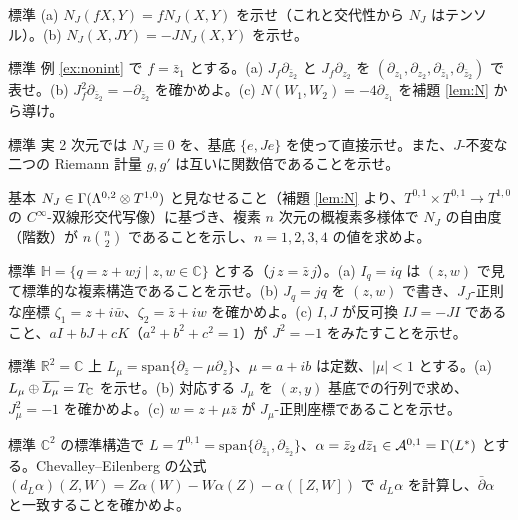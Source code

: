 \begin{prob}{標準}\label{p:Ntensor}
(a) $N_J(fX,Y)=fN_J(X,Y)$ を示せ（これと交代性から $N_J$ はテンソル）。(b) $N_J(X,JY)=-JN_J(X,Y)$ を示せ。
\end{prob}
\begin{prob}{標準}\label{p:Nexample}
例 \ref{ex:nonint} で $f=\bar z_1$ とする。(a) $J_f\partial_{\bar z_2}$ と $J_f\partial_{z_2}$ を $(\partial_{z_1},\partial_{z_2},\partial_{\bar z_1},\partial_{\bar z_2})$ で表せ。(b) $J_f^2\partial_{\bar z_2}=-\partial_{\bar z_2}$ を確かめよ。(c) $N(W_1,W_2)=-4\partial_{z_1}$ を補題 \ref{lem:N} から導け。
\end{prob}
\begin{prob}{標準}\label{p:dim2}
実 2 次元では $N_J\equiv0$ を、基底 $\{e,Je\}$ を使って直接示せ。また、$J$-不変な二つの Riemann 計量 $g,g'$ は互いに関数倍であることを示せ。
\end{prob}
\begin{prob}{基本}\label{p:Ndim}
$N_J\in\Gamma(\Lambda^{0,2}\otimes T^{1,0})$ と見なせること（補題 \ref{lem:N} より、$T^{0,1}\times T^{0,1}\to T^{1,0}$ の $C^\infty$-双線形交代写像）に基づき、複素 $n$ 次元の概複素多様体で $N_J$ の自由度（階数）が $n\binom n2$ であることを示し、$n=1,2,3,4$ の値を求めよ。
\end{prob}
\begin{prob}{標準}\label{p:quat}
$\mathbb H=\{q=z+wj\mid z,w\in\mathbb C\}$ とする（$j\,z=\bar z\,j$）。(a) $I_q=iq$ は $(z,w)$ で見て標準的な複素構造であることを示せ。(b) $J_q=jq$ を $(z,w)$ で書き、$J_J$-正則な座標 $\zeta_1=z+i\bar w$、$\zeta_2=\bar z+iw$ を確かめよ。(c) $I,J$ が反可換 $IJ=-JI$ であること、$aI+bJ+cK$（$a^2+b^2+c^2=1$）が $J^2=-1$ をみたすことを示せ。
\end{prob}
\begin{prob}{標準}\label{p:beltrami}
$\mathbb R^2=\mathbb C$ 上 $L_\mu=\mathrm{span}\{\partial_{\bar z}-\mu\partial_z\}$、$\mu=a+ib$ は定数、$|\mu|<1$ とする。(a) $L_\mu\oplus\overline{L_\mu}=T_{\mathbb C}$ を示せ。(b) 対応する $J_\mu$ を $(x,y)$ 基底での行列で求め、$J_\mu^2=-1$ を確かめよ。(c) $w=z+\mu\bar z$ が $J_\mu$-正則座標であることを示せ。
\end{prob}
\begin{prob}{標準}\label{p:Lalg}
$\mathbb C^2$ の標準構造で $L=T^{0,1}=\mathrm{span}\{\partial_{\bar z_1},\partial_{\bar z_2}\}$、$\alpha=\bar z_2\,d\bar z_1\in\mathcal A^{0,1}=\Gamma(L^*)$ とする。Chevalley--Eilenberg の公式 $(d_L\alpha)(Z,W)=Z\alpha(W)-W\alpha(Z)-\alpha([Z,W])$ で $d_L\alpha$ を計算し、$\bar\partial\alpha$ と一致することを確かめよ。
\end{prob}
